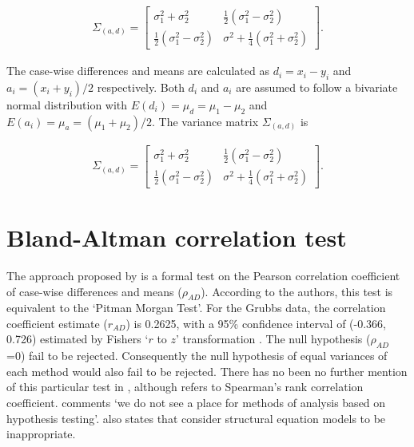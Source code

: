 \documentclass[12pt, a4paper]{report}
\theoremstyle{plain}
\theoremstyle{definition}
\theoremstyle{remark}
\begin{document}
	\begin{eqnarray}
	\Sigma_{(a,d)}= \left[\begin{matrix}
	\sigma^{2}_{1}+\sigma^{2}_{2}&\frac{1}{2}(\sigma^{2}_{1}-\sigma^{2}_{2})\\
	\frac{1}{2}(\sigma^{2}_{1}-\sigma^{2}_{2})&\sigma^{2}+
	\frac{1}{4}(\sigma^{2}_{1}+\sigma^{2}_{2})
	\end{matrix} \right].
	\end{eqnarray}
	
\bigskip


	
	The case-wise differences and means are calculated as $d_{i} =
	x_{i}-y_{i}$ and $a_{i} = (x_{i}+y_{i})/2$  respectively. Both
	$d_{i}$ and $a_{i}$ are assumed to follow a bivariate normal
	distribution with $E(d_{i})= \mu_{d} = \mu_{1} - \mu_{2}$ and
	$E(a_{i})= \mu_{a} = (\mu_{1} + \mu_{2})/2$. The variance matrix
	$\Sigma_{(a,d)}$ is
	
	\begin{eqnarray}
	\Sigma_{(a,d)}= \left[\begin{matrix}
	\sigma^{2}_{1}+\sigma^{2}_{2}&\frac{1}{2}(\sigma^{2}_{1}-\sigma^{2}_{2})\\
	\frac{1}{2}(\sigma^{2}_{1}-\sigma^{2}_{2})&\sigma^{2}+
	\frac{1}{4}(\sigma^{2}_{1}+\sigma^{2}_{2})
	\end{matrix} \right].
	\end{eqnarray}
	
	
	
		\section{Bland-Altman correlation test}
		
		The approach proposed by \citet{BA83} is a formal test on the
		Pearson correlation coefficient of case-wise differences and means
		($\rho_{AD}$). According to the authors, this test is equivalent
		to the `Pitman Morgan Test'. For the Grubbs data, the correlation
		coefficient estimate ($r_{AD}$) is 0.2625, with a 95\% confidence
		interval of (-0.366, 0.726) estimated by Fishers `$r$ to $z$'
		transformation \citep*{Cohen}. The null hypothesis ($\rho_{AD}$ =0)
		fail to be rejected. Consequently the null hypothesis of equal
		variances of each method would also fail to be rejected. There has
		no been no further mention of this particular test in
		\citet{BA86}, although \citet{BA99} refers to Spearman's rank
		correlation coefficient. \citet{BA99} comments `we do not see a
		place for methods of analysis based on hypothesis testing'.
		\citet{BA99} also states that consider structural equation models
		to be inappropriate.
		
\end{document}
